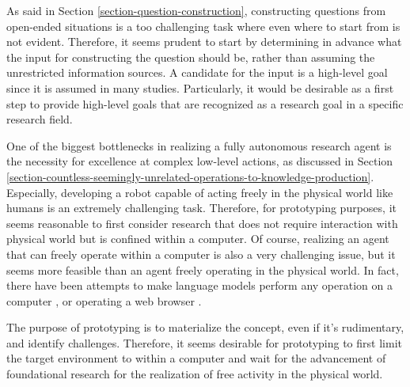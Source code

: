 As said in Section \ref{section-question-construction}, constructing questions from open-ended situations is a too challenging task where even where to start from is not evident. Therefore, it seems prudent to start by determining in advance what the input for constructing the question should be, rather than assuming the unrestricted information sources. A candidate for the input is a high-level goal since it is 
assumed in many studies. Particularly, it would be desirable as a first step to provide high-level goals that are recognized as a research goal in a specific research field.


One of the biggest bottlenecks in realizing a fully autonomous research agent is the necessity for excellence at complex low-level actions, as discussed in Section \ref{section-countless-seemingly-unrelated-operations-to-knowledge-production}. Especially, developing a robot capable of acting freely in the physical world like humans is an extremely challenging task. Therefore, for prototyping purposes, it seems reasonable to first consider research that does not require interaction with physical world but is confined within a computer. Of course, realizing an agent that can freely operate within a computer is also a very challenging issue, but it seems more feasible than an agent freely operating in the physical world. In fact, there have been attempts to make language models perform any operation on a computer \cite{openinterpreter,openai_chatgpt_plugins_code_interpreter_2023}, or operating a web browser \cite{nakano2021webgpt,act1}.

The purpose of prototyping is to materialize the concept, even if it's rudimentary, and identify challenges. Therefore, it seems desirable for prototyping to first limit the target environment to within a computer and wait for the advancement of foundational research for the realization of free activity in the physical world.

